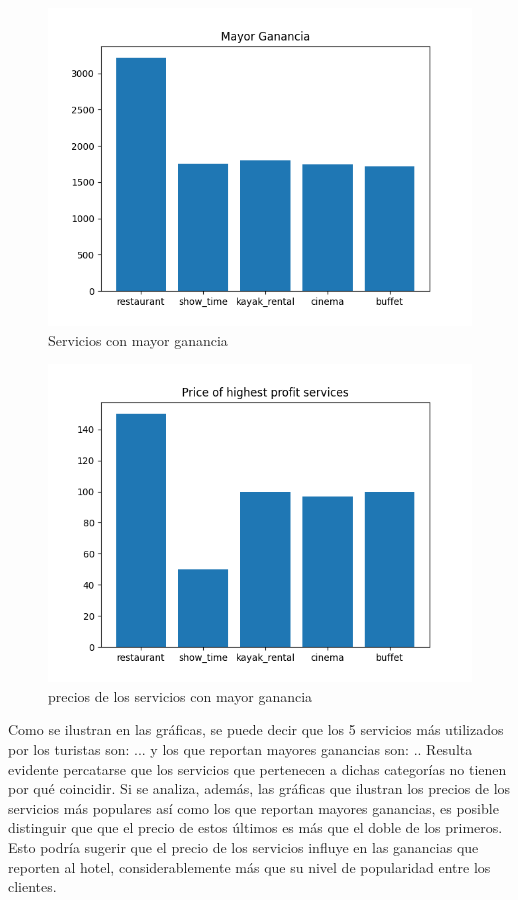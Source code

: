 \documentclass[12pt,a4paper]{article} \usepackage[spanish]{babel} \usepackage{graphicx} \usepackage{amsmath} \usepackage{amsfonts} \usepackage{amssymb} \usepackage{float} \usepackage{geometry}
\begin{document}
\begin{figure}[H] \centering \includegraphics[width=\textwidth]{Mayor Ganancia} \caption{Servicios con mayor ganancia} \label{fig:etiqueta} \end{figure}
\begin{figure}[H] \centering \includegraphics[width=\textwidth]{precio mayor ganancia} \caption{precios de los servicios con mayor ganancia} \label{fig:etiqueta} \end{figure}
Como se ilustran en las gráficas, se puede decir que los 5 servicios más utilizados por los turistas son: ... y los que reportan mayores ganancias son: .. Resulta evidente percatarse que los servicios que pertenecen a dichas categorías no tienen por qué coincidir. Si se analiza, además, las gráficas que ilustran los precios de los servicios más populares así como los que reportan mayores ganancias, es posible distinguir que que el precio de estos últimos es más que el doble de los primeros. Esto podría sugerir que el precio de los servicios influye en las ganancias que reporten al hotel, considerablemente más que su nivel de popularidad entre los clientes.
\end{document}
